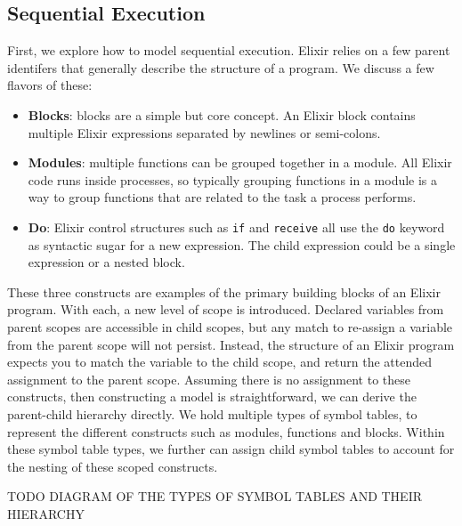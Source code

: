 \subsection{Sequential Execution} \label{sec:sequential_execution}
First, we explore how to model sequential execution. Elixir relies on a few parent identifers that generally describe the structure of a program. We discuss a few flavors of these:
\begin{itemize}
    \item \textbf{Blocks}: blocks are a simple but core concept. An Elixir block contains multiple Elixir expressions separated by newlines or semi-colons.
    \item \textbf{Modules}: multiple functions can be grouped together in a module. All Elixir code runs inside processes, so typically grouping functions in a module is a way to group functions that are related to the task a process performs.
    \item \textbf{Do}: Elixir control structures such as \texttt{if} and \texttt{receive} all use the \texttt{do} keyword as syntactic sugar for a new expression. The child expression could be a single expression or a nested block.
\end{itemize}
These three constructs are examples of the primary building blocks of an Elixir program. With each, a new level of scope is introduced. Declared variables from parent scopes are accessible in child scopes, but any match to re-assign a variable from the parent scope will not persist. Instead, the structure of an Elixir program expects you to match the variable to the child scope, and return the attended assignment to the parent scope. Assuming there is no assignment to these constructs, then constructing a model is straightforward, we can derive the parent-child hierarchy directly. We hold multiple types of symbol tables, to represent the different constructs such as modules, functions and blocks. Within these symbol table types, we further can assign child symbol tables to account for the nesting of these scoped constructs.
\par
TODO DIAGRAM OF THE TYPES OF SYMBOL TABLES AND THEIR HIERARCHY
\par
